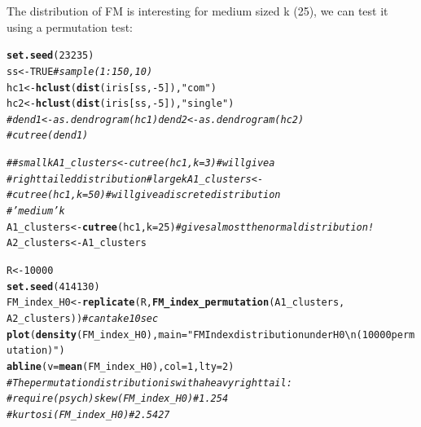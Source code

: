 \documentclass[shortnames,nojss,article]{jss}\usepackage[]{graphicx}\usepackage[]{color}
\makeatletter
\newcommand{\hlnum}[1]{\textcolor[rgb]{0.686,0.059,0.569}{#1}}%
\newcommand{\hlstr}[1]{\textcolor[rgb]{0.192,0.494,0.8}{#1}}%
\newcommand{\hlcom}[1]{\textcolor[rgb]{0.678,0.584,0.686}{\textit{#1}}}%
\newcommand{\hlopt}[1]{\textcolor[rgb]{0,0,0}{#1}}%
\newcommand{\hlstd}[1]{\textcolor[rgb]{0.345,0.345,0.345}{#1}}%
\newcommand{\hlkwb}[1]{\textcolor[rgb]{0.69,0.353,0.396}{#1}}%
\newcommand{\hlkwc}[1]{\textcolor[rgb]{0.333,0.667,0.333}{#1}}%
\newcommand{\hlkwd}[1]{\textcolor[rgb]{0.737,0.353,0.396}{\textbf{#1}}}%
\newenvironment{kframe}{%
 \def\at@end@of@kframe{}%
 \ifinner\ifhmode%
  \def\at@end@of@kframe{\end{minipage}}%
  \begin{minipage}{\columnwidth}%
 \fi\fi%
 \def\FrameCommand##1{\hskip\@totalleftmargin \hskip-\fboxsep
 \colorbox{shadecolor}{##1}\hskip-\fboxsep
     \hskip-\linewidth \hskip-\@totalleftmargin \hskip\columnwidth}%
 \MakeFramed {\advance\hsize-\width
   \@totalleftmargin\z@ \linewidth\hsize
   \@setminipage}}%
 {\par\unskip\endMakeFramed%
 \at@end@of@kframe}
\newenvironment{knitrout}{}{} %
\makeatother
\begin{document}
The distribution of FM is interesting for medium sized k (25), we can test it using a permutation test:

\begin{knitrout}
\color{fgcolor}\begin{kframe}
\begin{alltt}
\hlkwd{set.seed}\hlstd{(}\hlnum{23235}\hlstd{)}
\hlstd{ss} \hlkwb{<-} \hlnum{TRUE}  \hlcom{# sample(1:150, 10 )}
\hlstd{hc1} \hlkwb{<-} \hlkwd{hclust}\hlstd{(}\hlkwd{dist}\hlstd{(iris[ss,} \hlopt{-}\hlnum{5}\hlstd{]),} \hlstr{"com"}\hlstd{)}
\hlstd{hc2} \hlkwb{<-} \hlkwd{hclust}\hlstd{(}\hlkwd{dist}\hlstd{(iris[ss,} \hlopt{-}\hlnum{5}\hlstd{]),} \hlstr{"single"}\hlstd{)}
\hlcom{# dend1 <- as.dendrogram(hc1) dend2 <- as.dendrogram(hc2)}
\hlcom{# cutree(dend1)}

\hlcom{# # small k A1_clusters <- cutree(hc1, k=3) # will give a}
\hlcom{# right tailed distribution # large k A1_clusters <-}
\hlcom{# cutree(hc1, k=50) # will give a discrete distribution}
\hlcom{# 'medium' k}
\hlstd{A1_clusters} \hlkwb{<-} \hlkwd{cutree}\hlstd{(hc1,} \hlkwc{k} \hlstd{=} \hlnum{25}\hlstd{)}  \hlcom{# gives almost the normal distribution!}
\hlstd{A2_clusters} \hlkwb{<-} \hlstd{A1_clusters}

\hlstd{R} \hlkwb{<-} \hlnum{10000}
\hlkwd{set.seed}\hlstd{(}\hlnum{414130}\hlstd{)}
\hlstd{FM_index_H0} \hlkwb{<-} \hlkwd{replicate}\hlstd{(R,} \hlkwd{FM_index_permutation}\hlstd{(A1_clusters,}
    \hlstd{A2_clusters))}  \hlcom{# can take 10 sec}
\hlkwd{plot}\hlstd{(}\hlkwd{density}\hlstd{(FM_index_H0),} \hlkwc{main} \hlstd{=} \hlstr{"FM Index distribution under H0\textbackslash{}n (10000 permutation)"}\hlstd{)}
\hlkwd{abline}\hlstd{(}\hlkwc{v} \hlstd{=} \hlkwd{mean}\hlstd{(FM_index_H0),} \hlkwc{col} \hlstd{=} \hlnum{1}\hlstd{,} \hlkwc{lty} \hlstd{=} \hlnum{2}\hlstd{)}
\hlcom{# The permutation distribution is with a heavy right tail:}
\hlcom{# require(psych) skew(FM_index_H0) # 1.254}
\hlcom{# kurtosi(FM_index_H0) # 2.5427}


\end{alltt}
\end{kframe}
\end{knitrout}
\end{document}
